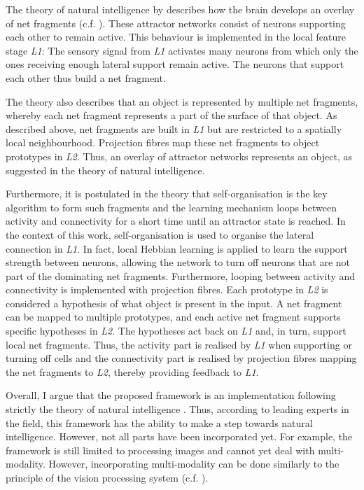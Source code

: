 The theory of natural intelligence by  describes how the brain develops an overlay of net fragments (c.f. ). These attractor networks consist of neurons supporting each other to remain active.
This behaviour is implemented in the local feature stage \emph{L1}: The sensory signal from \emph{L1} activates many neurons from which only the ones receiving enough lateral support remain active. The neurons that support each other thus build a net fragment.

The theory also describes that an object is represented by multiple net fragments, whereby each net fragment represents a part of the surface of that object.
As described above, net fragments are built in \emph{L1} but are restricted to a spatially local neighbourhood. Projection fibres map these net fragments to object prototypes in \emph{L2}. Thus, an overlay of attractor networks represents an object, as suggested in the theory of natural intelligence.

Furthermore, it is postulated in the theory that self-organisation is the key algorithm to form such fragments and the learning mechanism loops between activity and connectivity for a short time until an attractor state is reached.
In the context of this work, self-organisation is used to organise the lateral connection in \emph{L1}. In fact, local Hebbian learning is applied to learn the support strength between neurons, allowing the network to turn off neurons that are not part of the dominating net fragments.
Furthermore, looping between activity and connectivity is implemented with projection fibres. 
Each prototype in \emph{L2} is considered a hypothesis of what object is present in the input. A net fragment can be mapped to multiple prototypes, and each active net fragment supports specific hypotheses in \emph{L2}. The hypotheses act back on \emph{L1} and, in turn, support local net fragments. Thus, the activity part is realised by \emph{L1} when supporting or turning off cells and the connectivity part is realised by projection fibres mapping the net fragments to \emph{L2}, thereby providing feedback to \emph{L1}.

Overall, I argue that the proposed framework is an implementation following strictly the theory of natural intelligence \cite{von_der_malsburg_theory_2022}. Thus, according to leading experts in the field, this framework has the ability to make a step towards natural intelligence. However, not all parts have been incorporated yet. For example, the framework is still limited to processing images and cannot yet deal with multi-modality. However, incorporating multi-modality can be done similarly to the principle of the vision processing system (c.f. ).



